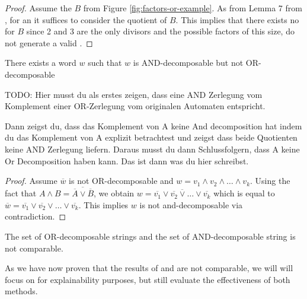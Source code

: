 \begin{proof}
	Assume the \DFA $B$ from Figure \ref{fig:factors-or-example}.
	As from Lemma 7 from \cite{unara-prime-languages}, for an \andDecomp it suffices to consider the quotient \DFAs of $B$.
	This implies that there exists no \andDecomp for \DFA $B$ since 2 and 3 are the only divisors and the possible factors of this size, do not generate a valid \andDecomp.
\end{proof}



\begin{theorem}
	There exists a word $w$ such that $w$ is AND-decomposable but not OR-decomposable
\end{theorem}

TODO:
Hier musst du als erstes zeigen, dass eine AND Zerlegung vom Komplement einer OR-Zerlegung vom originalen Automaten entspricht.

Dann zeigst du, dass das Komplement von A keine And decomposition hat indem du das Komplement von A explizit betrachtest und zeigst dass beide Quotienten keine AND Zerlegung liefern. Daraus musst du dann Schlussfolgern, dass A keine Or Decomposition haben kann. Das ist dann was du hier schreibst. 

\begin{proof}
	Assume $\overbar{w}$ is not OR-decomposable and $w = v_1 \land v_2 \land \dots \land v_k$.
	Using the fact  that $A \land B = \overbar{\overbar{A} \lor \overbar{B}}$, we obtain $w = \overbar{\overbar{v_1} \lor \overbar{v_2} \lor \dots \lor \overbar{v_k}}$ which is equal to $\overbar{w} = \overbar{v_1} \lor \overbar{v_2} \lor \dots \lor \overbar{v_k}$.
	This implies $w$ is not and-decomposable via contradiction.
\end{proof}

\begin{corollary}
	The set of OR-decomposable strings and the set of AND-decomposable string is not comparable.
\end{corollary}

As we have now proven that the results of \andDecomp and \orDecomp are not comparable, we will will focus on \orDecomp for explainability purposes, but still evaluate the effectiveness of both methods.


